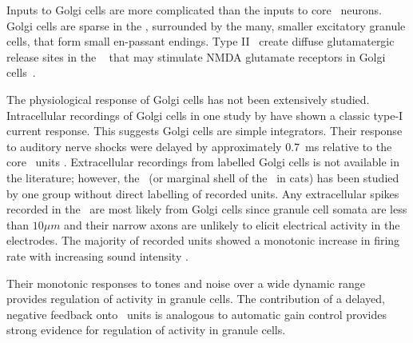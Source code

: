


Inputs to Golgi cells are more complicated than the inputs to core \VCN~neurons. 
Golgi cells are sparse in the \GCD, surrounded by the many, smaller excitatory granule cells, that form small en-passant endings. 
Type II \ANFs~create diffuse glutamatergic release sites in the \GCD~\citep{HurdHutsonEtAl:1999,BensonBrown:2004} that may stimulate NMDA glutamate receptors in Golgi cells~\citep{FerragamoGoldingEtAl:1998a}.


The physiological response of Golgi cells has not been extensively studied. 
Intracellular recordings of Golgi cells in one study by \citet{FerragamoGoldingEtAl:1998} have shown a classic type-I current response. 
This suggests Golgi cells are simple integrators. 
Their response to auditory nerve shocks were delayed by approximately 0.7~ms relative to the core \VCN~units \citep{FerragamoGoldingEtAl:1998}. 
Extracellular recordings from labelled Golgi cells is not available in the literature; however, the \GCD~(or marginal shell of the \VCN~in cats) has been studied by one group \citet{GhoshalKim:1997} without direct labelling of recorded units. 
Any extracellular spikes recorded in the \GCD~are most likely from Golgi cells since granule cell somata are less than $10 \mu{m}$ and their narrow axons are unlikely to elicit electrical activity in the electrodes. 
The majority of recorded units showed a monotonic increase in firing rate with increasing sound intensity \citep[Figure~\ref{fig:GolgiKimFig2}][]{GhoshalKim:1997}.


Their monotonic responses to tones and noise over a wide dynamic range provides regulation of activity in granule cells. 
The contribution of a delayed, negative feedback onto \VCN~units is analogous to automatic gain control provides strong evidence for regulation of activity in granule cells.

